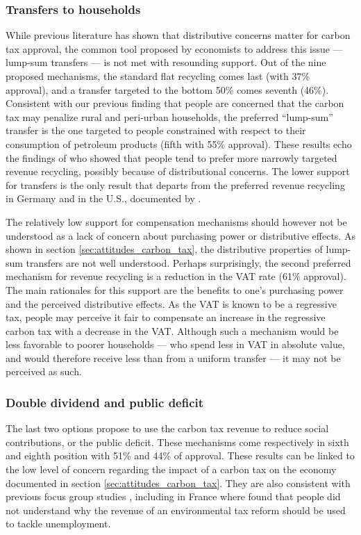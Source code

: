 \documentclass[english,5p,authoryear]{elsarticle}
\begin{document}
        \subsubsection{Transfers to households}
%
While previous literature has shown that distributive concerns matter for carbon tax approval, the common tool proposed by economists to address this issue --- lump-sum transfers --- is not met with resounding support. Out of the nine proposed mechanisms, the standard flat recycling comes last (with 37\% approval), and a transfer targeted to the bottom 50\% comes seventh (46\%). Consistent with our previous finding that people are concerned that the carbon tax may penalize rural and peri-urban households, the preferred ``lump-sum'' transfer is the one targeted to people constrained with respect to their consumption of petroleum products (fifth with 55\% approval). These results echo the findings of \citet{kallbekken_et_al_2011} who showed that people tend to prefer more narrowly targeted revenue recycling, possibly because of distributional concerns. The lower support for transfers is the only result that departs from the preferred revenue recycling in Germany and in the U.S., documented by \citet{beiser-mcgrath_could_2019}.%

The relatively low support for compensation mechanisms should however not be understood as a lack of concern about purchasing power or distributive effects. As shown in section \ref{sec:attitudes_carbon_tax}, the distributive properties of lump-sum transfers are not well understood. Perhaps surprisingly, the second preferred mechanism for revenue recycling is a reduction in the VAT rate (61\% approval). The main rationales for this support are the benefits to one's purchasing power and the perceived distributive effects. As the VAT is known to be a regressive tax, people may perceive it fair to compensate an increase in the regressive carbon tax with a decrease in the VAT. Although such a mechanism would be less favorable to poorer households --- who spend less in VAT in absolute value, and would therefore receive less than from a uniform transfer --- it may not be perceived as such. %

%

        \subsubsection{Double dividend and public deficit}

The last two options propose to use the carbon tax revenue to reduce social contributions, or the public deficit. These mechanisms come respectively in sixth and eighth position with 51\% and 44\% of approval. These results can be linked to the low level of concern regarding the impact of a carbon tax on the economy documented in section \ref{sec:attitudes_carbon_tax}. They are also consistent with previous focus group studies \citep[e.g.][]{kallbekken_aasen_2010}, including in France where \citet{deroubaix_rise_2006} found that people did not understand why the revenue of an environmental tax reform should be used to tackle unemployment.
\end{document}
